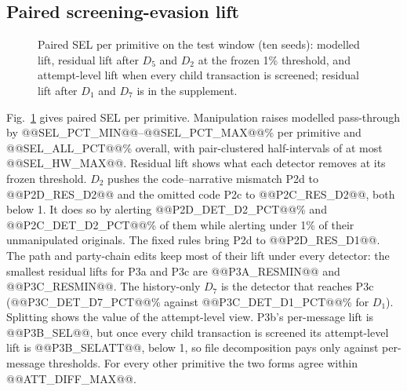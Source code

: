 \documentclass[conference]{IEEEtran}
\begin{document}
\subsection{Paired screening-evasion lift}
\begin{figure}[!t]
\centering
{}
\caption{Paired SEL per primitive on the test window (ten seeds): modelled
lift, residual lift after $D_5$ and $D_2$ at the frozen 1\% threshold, and
attempt-level lift when every child transaction is screened; residual lift
after $D_1$ and $D_7$ is in the supplement.}
\label{fig:sel}
\end{figure}
Fig.~\ref{fig:sel} gives paired SEL per primitive. Manipulation raises
modelled pass-through by @@SEL_PCT_MIN@@--@@SEL_PCT_MAX@@\% per primitive and
@@SEL_ALL_PCT@@\% overall, with pair-clustered half-intervals of at most
@@SEL_HW_MAX@@. Residual lift shows what each detector removes at its frozen
threshold. $D_2$ pushes the code--narrative mismatch P2d to @@P2D_RES_D2@@
and the omitted code P2c to @@P2C_RES_D2@@, both below 1. It does so by
alerting @@P2D_DET_D2_PCT@@\% and @@P2C_DET_D2_PCT@@\% of them while
alerting under 1\% of their unmanipulated originals. The fixed rules bring
P2d to @@P2D_RES_D1@@. The path and party-chain edits keep most of their lift under
every detector: the smallest residual lifts for P3a and P3c are
@@P3A_RESMIN@@ and @@P3C_RESMIN@@. The history-only $D_7$ is the detector
that reaches P3c (@@P3C_DET_D7_PCT@@\% against @@P3C_DET_D1_PCT@@\% for
$D_1$). Splitting shows the value of the attempt-level view. P3b's
per-message lift is @@P3B_SEL@@, but once every child transaction is screened
its attempt-level lift is @@P3B_SELATT@@, below 1, so file decomposition pays
only against per-message thresholds. For every other primitive the two forms
agree within @@ATT_DIFF_MAX@@.
\end{document}
